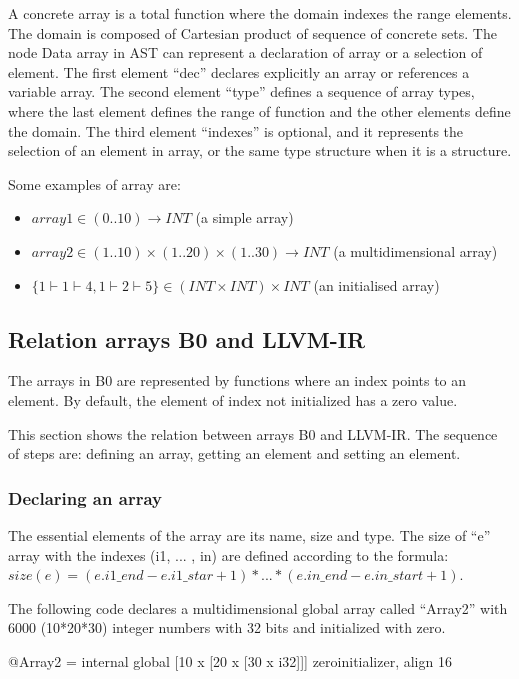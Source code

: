 \documentclass[10pt,a4paper]{article}
\begin{document}
A concrete array is a total function where the domain indexes the range 
elements. The domain is composed of Cartesian product of sequence of concrete 
sets. The node Data array in AST can represent a declaration of array or a 
selection of element. The first element ``dec'' declares explicitly an array or 
references a variable array. The second element ``type'' defines a sequence of 
array types, where the last element defines the range of function and the other 
elements define the domain. The third element ``indexes'' is optional, and it 
represents the selection of an element in array, or the same type structure 
when it is a structure.

Some examples of array are:
\begin{itemize}
	\item $array1 \in (0..10) \to INT $	(a simple array)
	\item $array2 \in (1..10) \times (1..20) \times (1..30) \to INT $   (a multidimensional array)
	\item $\{1\vdash1\vdash4, 1\vdash2\vdash5\}  \in (INT \times INT) \times INT$ (an initialised array)
\end{itemize} 


\subsection{Relation arrays B0 and LLVM-IR}

The arrays in B0 are represented by functions where an index points to an 
element. By default, the element of index not initialized has a zero value. 

This section shows the relation between arrays B0 and LLVM-IR. The sequence of
steps are: defining  an array, getting an element and setting an
element.

\subsubsection{Declaring an array}


The essential elements of the array are its name, size and type. 
The size of ``e'' array with the indexes (i1, ... , in) are defined according 
to the formula: $size(e) = (e.i1\_end - e.i1\_star+1) * ... * (e.in\_end - 
e.in\_start+1)$.

The following code declares a multidimensional global array called ``Array2'' 
with 6000 (10*20*30) integer numbers with 32 bits and initialized with zero.

\begin{llvmcode}
@Array2 = internal global [10 x [20 x [30 x i32]]] zeroinitializer, align 16
\end{llvmcode}
\end{document}
